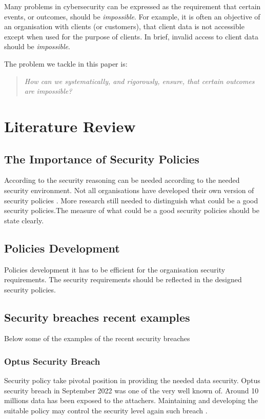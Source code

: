 \documentclass[journal]{IEEEtran}
\begin{document}
Many problems in cybersecurity can be expressed as the requirement that certain
events, or outcomes, should be {\em impossible}.
For example, it is often an objective of an organisation with clients (or
customers), that client data is not accessible except when used for the purpose
of clients. In brief, invalid access to client data should be {\em impossible}.

The problem we tackle in this paper is:
\begin{quote}\em
  How can we systematically, and rigorously, ensure, that
  certain outcomes are impossible?
\end{quote}


\section{Literature Review}

\subsection{The Importance of Security Policies}
According to \cite{glasgow1992logic} the security reasoning can
be needed according to the needed security environment.  Not all
organisations have developed their own version of security policies
\cite{paananen2020state}. More research still needed to distinguish what
could be a good security policies.The measure of what could be a good
security policies should be state clearly.

\subsection{Policies Development}
Policies development it has to be efficient for the organisation security
requirements. The security requirements should be reflected in the
designed security policies.

\subsection{Security breaches recent examples}
Below some of the examples of the recent security breaches

\subsubsection{Optus Security Breach}
Security policy take pivotal position in providing the needed data security. Optus security breach in 
September 2022 was one of the very well known of. Around 10 millions data has been exposed to the attachers. 
Maintaining and developing the suitable policy may control the security level again such breach 
\cite{biddle2022data}\cite{biddle2022public}.
\end{document}
